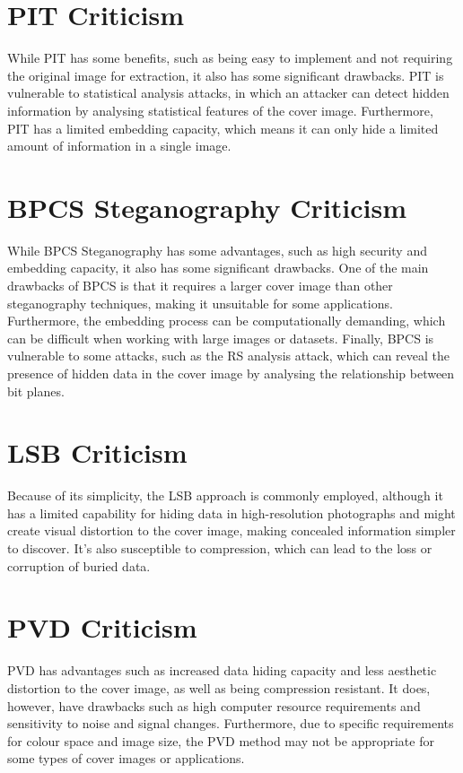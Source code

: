 \section{ PIT Criticism }
While PIT has some benefits, such as being easy to implement and not requiring the original image for extraction, it also has some significant drawbacks. PIT is vulnerable to statistical analysis attacks, in which an attacker can detect hidden information by analysing statistical features of the cover image. Furthermore, PIT has a limited embedding capacity, which means it can only hide a limited amount of information in a single image.

\section{ BPCS Steganography Criticism }
While BPCS Steganography has some advantages, such as high security and embedding capacity, it also has some significant drawbacks. One of the main drawbacks of BPCS is that it requires a larger cover image than other steganography techniques, making it unsuitable for some applications. Furthermore, the embedding process can be computationally demanding, which can be difficult when working with large images or datasets. Finally, BPCS is vulnerable to some attacks, such as the RS analysis attack, which can reveal the presence of hidden data in the cover image by analysing the relationship between bit planes.

\section{ LSB Criticism }
Because of its simplicity, the LSB approach is commonly employed, although it has a limited capability for hiding data in high-resolution photographs and might create visual distortion to the cover image, making concealed information simpler to discover. It's also susceptible to compression, which can lead to the loss or corruption of buried data.

\section{ PVD Criticism }
PVD has advantages such as increased data hiding capacity and less aesthetic distortion to the cover image, as well as being compression resistant. It does, however, have drawbacks such as high computer resource requirements and sensitivity to noise and signal changes. Furthermore, due to specific requirements for colour space and image size, the PVD method may not be appropriate for some types of cover images or applications.






